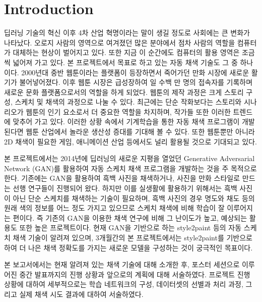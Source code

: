 \section{Introduction}

딥러닝 기술의 혁신 이후 4차 산업 혁명이라는 말이 생길 정도로 사회에는 큰 변화가 나타났다. 
오로지 사람의 영역으로 여겨졌던 많은 분야에서 점차 사람의 역할을 컴퓨터가 대체하는 현상이 벌어지고 있다. 또한 지금 이 순간에도 컴퓨터의 활용 영역은 조금씩 넓어져 가고 있다. 
본 프로젝트에서 목표로 하고 있는 자동 채색 기술도 그 중 하나이다. 
2000년대 중반 웹툰이라는 플랫폼이 등장하면서 죽어가던 만화 시장에 새로운 활기가 불어넣어졌다. 
이후 웹툰 시장은 급성장하여 일 수백 만 명의 접속자를 기록하며 새로운 문화 플랫폼으로서의 역할을 하게 되었다. 
웹툰의 제작 과정은 크게 스토리 구성, 스케치 및 채색의 과정으로 나눌 수 있다.
최근에는 단순 작화보다는 스토리와 시나리오가 웹툰의 인기 요소로서 더 중요한 역할을 차지하며, 작가들 또한 이러한 트렌드에 맞추어 가고 있다.
이러한 상황 속에서 기계학습을 통한 자동 채색 프로그램이 개발된다면 웹툰 산업에서 놀라운 생산성 증대를 기대해 볼 수 있다. 
또한 웹툰뿐만 아니라 2D 채색이 필요한 게임, 애니메이션 산업 등에서도 널리 활용될 것으로 기대되고 있다.

본 프로젝트에서는 2014년에 딥러닝의 새로운 지평을 열었던 Generative Adversarial Network (GAN)를 활용하여 자동 스케치 채색 프로그램을 개발하는 것을 주 목적으로 한다. 
기존에는 GAN을 활용하여 흑백 사진을 채색하거나, 사진을 만화 스타일로 만드는 선행 연구들이 진행되어 왔다.
하지만 이를 실생활에 활용하기 위해서는 흑백 사진이 아닌 단순 스케치를 채색하는 기술이 필요하며, 흑백 사진의 경우 명도와 채도 등의 원래 색의 정보를 어느 정도 가지고 있으므로 스케치 채색에 비해 학습이 잘 이루어지는 편이다. 
즉 기존의 GAN을 이용한 채색 연구에 비해 그 난이도가 높고, 예상되는 활용도 또한 높은 프로젝트이다. 
현재 GAN을 기반으로 하는 style2paint 등의 자동 스케치 채색 기술이 알려져 있으며, 3개월간의 본 프로젝트에서는 style2paint를 기반으로 하여 더 나은 채색 정확도를 가지는 새로운 모델을 구성하는 것이 궁극적인 목표이다.

본 보고서에서는 현재 알려져 있는 채색 기술에 대해 소개한 후, 포스터 세션으로 이루어진 중간 발표까지의 진행 상황과 앞으로의 계획에 대해 서술하였다. 프로젝트 진행 상황에 대하여 세부적으로는 학습 네트워크의 구성, 데이터셋의 선별과 처리 과정, 그리고 실제 채색 시도 결과에 대하여 서술하였다.
